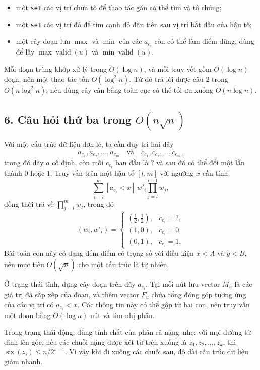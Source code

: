\documentclass[11pt]{article}
\begin{document}
\begin{itemize}
  \item một \texttt{set} các vị trí chưa tô để thao tác gán có thể tìm và tô
  chúng;
  \item một \texttt{set} các vị trí đỏ để tìm cạnh đỏ đầu tiên sau vị trí bắt
  đầu của hậu tố;
  \item một cây đoạn lưu \(\max\) và \(\min\) của các \(a_{e_i}\) còn có thể
  làm điểm dừng, dùng để lấy \(\max \operatorname{valid}(u)\) và
  \(\min \operatorname{valid}(u)\).
\end{itemize}

Mỗi đoạn trùng khớp xử lý trong \(O(\log n)\), và mỗi truy vết gồm
\(O(\log n)\) đoạn, nên một thao tác tốn \(O(\log^2 n)\). Từ đó trả lời được
câu 2 trong \(O(n\log^2 n)\); nếu dùng cây cân bằng toàn cục có thể tối ưu
xuống \(O(n\log n)\).

\subsection*{6. Câu hỏi thứ ba trong \(O(n\sqrt n)\)}

Với một cấu trúc dữ liệu đơn lẻ, ta cần duy trì hai dãy
\[
  a_{e_1},a_{e_2},\ldots,a_{e_m}
  \quad\text{và}\quad
  c_{e_1},c_{e_2},\ldots,c_{e_m},
\]
trong đó dãy \(a\) cố định, còn mỗi \(c_{e_i}\) ban đầu là \(?\) và sau đó có
thể đổi một lần thành \(0\) hoặc \(1\). Truy vấn trên một hậu tố \([l,m]\) với
ngưỡng \(x\) cần tính
\[
  \sum_{i=l}^m [a_{e_i}<x]\,w'_i\prod_{j=l}^{i-1} w_j,
\]
đồng thời trả về \(\prod_{j=l}^m w_j\), trong đó
\[
  (w_i,w'_i)=
  \begin{cases}
    (\tfrac12,\tfrac12), & c_{e_i}=?,\\
    (1,0), & c_{e_i}=0,\\
    (0,1), & c_{e_i}=1.
  \end{cases}
\]
Bài toán con này có dạng đếm điểm có trọng số với điều kiện \(x<A\) và \(y<B\),
nên mục tiêu \(O(\sqrt n)\) cho một cấu trúc là tự nhiên.

Ở trạng thái tĩnh, dựng cây đoạn trên dãy \(a_{e_i}\). Tại mỗi nút lưu vector
\(M_u\) là các giá trị đã sắp xếp của đoạn, và thêm vector \(F_u\) chứa tổng
đóng góp tương ứng của các vị trí có \(a_{e_i}<x\). Các thông tin này có thể
gộp từ hai con, nên truy vấn một đoạn bằng \(O(\log n)\) nút và tìm nhị phân.

Trong trạng thái động, dùng tính chất của phân rã nặng--nhẹ: với mọi đường từ
đỉnh lên gốc, nếu các chuỗi nặng được xét từ trên xuống là
\(z_1,z_2,\ldots,z_k\), thì \(\operatorname{siz}(z_i)\le n/2^{i-1}\). Vì vậy
khi đi xuống các chuỗi sau, độ dài cấu trúc dữ liệu giảm nhanh.
\end{document}
